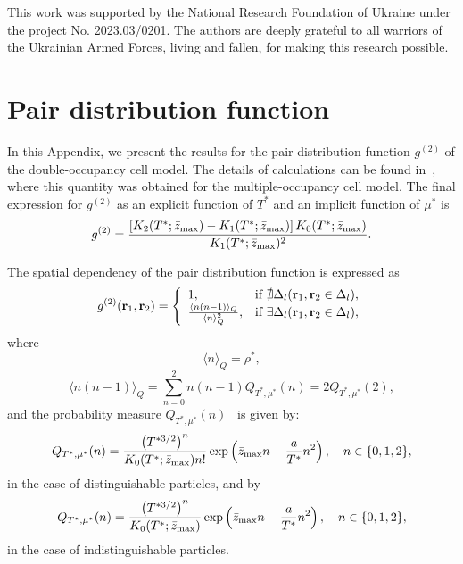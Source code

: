 \documentclass[pdflatex,sn-mathphys-num]{sn-jnl}%
\theoremstyle{thmstyleone}%
\theoremstyle{thmstyletwo}%
\theoremstyle{thmstylethree}%
\begin{document}
	
	 This work was supported by the National Research Foundation of Ukraine under the project No. 2023.03/0201. The authors are
	deeply grateful to all warriors of the Ukrainian Armed Forces, living and fallen, for making this research possible.
	
	\appendix
	
	\section{Pair distribution function}\label{sec:pair}
	In this Appendix, we present the results for the pair distribution function $g^{(2)}$ of the double-occupancy cell model. The details of calculations can be found in~\cite{RDKPS25arxiv3}, where this quantity was obtained for the multiple-occupancy cell model. The final expression for $g^{(2)}$ as an explicit function of $T^*$ and an implicit function of $\mu^*$ is
	\begin{equation}
		\label{eq:g2_in_z}
		g^{(2)} = \frac{\left[{K}_2(T^*; \bar{z}_{\rm max}) - {K}_1(T^*; \bar{z}_{\rm max})\right] {K}_0(T^*; \bar{z}_{\rm max})}{{K}_1(T^*; \bar{z}_{\rm max})^2}.
	\end{equation}
	
	The spatial dependency of the pair distribution function is expressed as
	\begin{equation}
		\label{g2_r}
		g^{(2)}({\vb r}_1, {\vb r}_2) =  \left\{
		\begin{array}{ll}
			1, & \text{if } \nexists \Delta_l ({\vb r}_1, {\vb r}_2 \in \Delta_l),
			\\
			\frac{\langle n(n-1) \rangle_{Q}}{\langle n \rangle_{Q}^2}, & \text{if } \exists \Delta_l ({\vb r}_1, {\vb r}_2 \in \Delta_l),
		\end{array}
		\right.
	\end{equation}
	where
	\begin{equation}
		\langle n \rangle_{Q} = \rho^*,
	\end{equation}
	\begin{equation}
		\langle n(n-1) \rangle_{Q} = \sum_{n=0}^{2} n(n-1) Q_{T^*, \mu^*}(n) = 2 Q_{T^*, \mu^*}(2),
	\end{equation}
	and the probability measure $Q_{T^*,\mu^*}(n)$~\cite{KKD20} is given by:	
	\begin{equation*}
		Q_{T^*,\mu^*}(n) = \frac{\left(T^{*3/2}\right)^n}{K_0(T^*; \bar{z}_{\rm max}) n!} \exp\left(\bar{z}_{\rm max}n - \frac{a}{T^*}n^2 \right),
		\quad n \in \{0,1,2\},
	\end{equation*}
	in the case of distinguishable particles, and by
	\begin{equation*}
		Q_{T^*,\mu^*}(n) = \frac{\left(T^{*3/2}\right)^n}{K_0(T^*; \bar{z}_{\rm max})} \exp\left(\bar{z}_{\rm max}n - \frac{a}{T^*}n^2 \right),
		\quad n \in \{0,1,2\},
	\end{equation*}
	in the case of indistinguishable particles.
	
\end{document}
